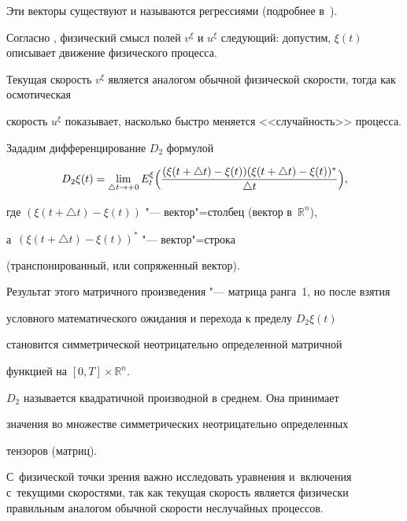 Эти векторы существуют и называются регрессиями (подробнее в~\cite{popovkoval:bib:G,popovkoval:bib:Par}).



Согласно \cite{popovkoval:bib:N2,popovkoval:bib:N3}, физический смысл полей $v^\xi$ и $u^\xi$ следующий: допустим, $\xi(t)$ описывает движение физического процесса. 

Текущая скорость $v^\xi$ является аналогом обычной физической скорости, тогда как осмотическая

скорость $u^\xi$ показывает, насколько быстро меняется <<случайность>> процесса.



Зададим дифференцирование $D_2$ формулой

\begin{equation}

           D_2\xi(t)=\lim\limits_{\triangle t\rightarrow +0}E^\xi_t

           \Bigl(\frac{(\xi(t+\triangle t)-\xi(t))(\xi(t+\triangle

           t)-\xi(t))^*}{\triangle t}\Bigr),

           \label{eq:kov:dirNew}

\end{equation}

где $(\xi(t+\triangle t)-\xi(t))$ "--- вектор"=столбец (вектор в~$\mathbb{R}^n$), 

а~$(\xi(t+\triangle t)-\xi(t))^*$ "--- вектор"=строка

       (транспонированный, или сопряженный вектор). 

Результат этого матричного произведения "--- матрица ранга~1, но после взятия

условного математического ожидания и перехода к пределу $D_2\xi(t)$

становится симметрической неотрицательно определенной матричной

функцией на $[0, T]\times \mathbb{R}^n$.



$D_2$ называется квадратичной производной в среднем. Она принимает

значения во множестве симметрических неотрицательно определенных

тензоров (матриц).

С~физической точки зрения важно исследовать  уравнения и~включения с~текущими скоростями, так как текущая скорость является физически правильным       аналогом обычной скорости неслучайных процессов. 

